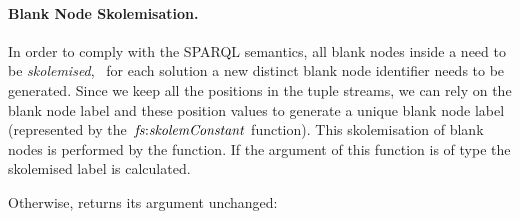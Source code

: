 \paragraph{Blank Node Skolemisation.}
%
In order to comply with the SPARQL \CONSTRUCT semantics, all blank nodes inside a \ConstructTemplate need
to be \emph{skolemised}, \ie~for each solution a new distinct blank node identifier needs to be generated.
%
Since we keep all the positions in the tuple streams, we can rely on the blank node label and these position values to
generate a unique blank node label (represented by the~$\mathit{fs{:}skolemConstant}$ function).
%
This skolemisation of blank nodes is performed by the  function.  If the argument of this function
is of type  the skolemised label is calculated.  
%
\begin{dynamicrule}%
    \singleLine
  \label{eq:bnode-skolem}
\end{dynamicrule}%
%
Otherwise,  returns its argument unchanged:
%
\begin{dynamicrule}
  \singleLine
  \label{eq:bnode-skolem-default}
\end{dynamicrule}%



